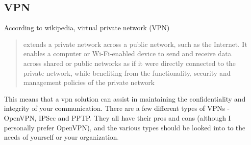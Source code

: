 \subsection{VPN}
According to wikipedia, virtual private network (VPN)
\begin{quote}
extends a private network across a public network, such as the Internet. It enables a computer or Wi-Fi-enabled device to send and receive data across shared or public networks as if it were directly connected to the private network, while benefiting from the functionality, security and management policies of the private network
\end{quote}
This means that a vpn solution can assist in maintaining the confidentiality and integrity of your communication.
There are a few different types of VPNs - OpenVPN, IPSec and PPTP. They all have their pros and cons (although I personally prefer OpenVPN), and the various types should be looked into to  the needs of yourself or your organization.